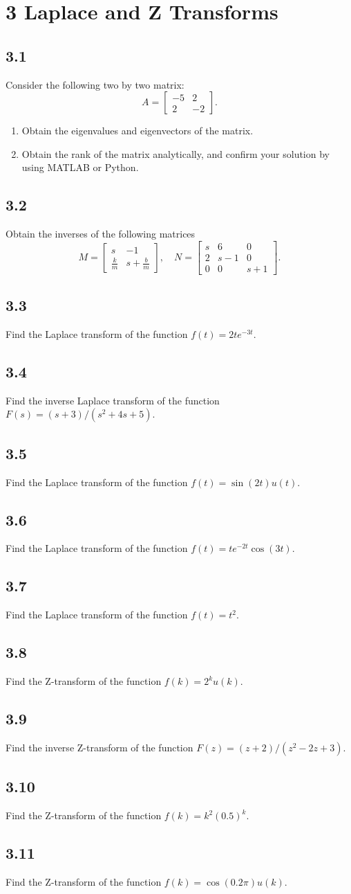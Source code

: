 \documentclass{article}
\newcommand{\problem}[2]{\subsection*{#1}}
\begin{document}
\section*{3 Laplace and Z Transforms}

\problem{3.1}{}
Consider the following two by two matrix:
\[
A = \begin{bmatrix} -5 & 2 \\ 2 & -2 \end{bmatrix}.
\]
\begin{enumerate}
\item Obtain the eigenvalues and eigenvectors of the matrix.
\item Obtain the rank of the matrix analytically, and confirm your solution by using MATLAB or Python.
\end{enumerate}

\problem{3.2}{}
Obtain the inverses of the following matrices
\[
M = \begin{bmatrix} s & -1 \\ \frac{k}{m} & s + \frac{b}{m} \end{bmatrix}, \quad
N = \begin{bmatrix} s & 6 & 0 \\ 2 & s - 1 & 0 \\ 0 & 0 & s + 1 \end{bmatrix}.
\]

\problem{3.3}{laplace-drills}
Find the Laplace transform of the function $f(t) = 2te^{-3t}$.

\problem{3.4}{laplace-drills}
Find the inverse Laplace transform of the function $F(s) = (s + 3)/(s^2 + 4s + 5)$.

\problem{3.5}{laplace-drills}
Find the Laplace transform of the function $f(t) = \sin(2t)u(t)$.

\problem{3.6}{laplace-drills}
Find the Laplace transform of the function $f(t) = te^{-2t}\cos(3t)$.

\problem{3.7}{laplace-drills}
Find the Laplace transform of the function $f(t) = t^2$.

\problem{3.8}{z-drills}
Find the Z-transform of the function $f(k) = 2^k u(k)$.

\problem{3.9}{z-drills}
Find the inverse Z-transform of the function $F(z) = (z + 2)/(z^2 - 2z + 3)$.

\problem{3.10}{z-drills}
Find the Z-transform of the function $f(k) = k^2 (0.5)^k$.

\problem{3.11}{z-drills}
Find the Z-transform of the function $f(k) = \cos(0.2\pi)u(k)$.
\end{document}
